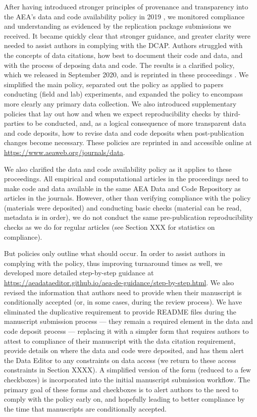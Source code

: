 \documentclass[PP]{AEA}
\begin{document}
After having introduced stronger principles of provenance and transparency into the  \ac{AEA}'s data and code availability policy in 2019 \citep{10.1257/pandp.110.dcap}, we monitored compliance and understanding as evidenced by the replication package submissions we received. It became quickly clear that stronger guidance, and greater clarity were needed to assist authors in complying with the \ac{DCAP}. Authors struggled with the concepts of data citations, how best to document their code and data, and with the process of deposing data and code. The results is a clarified policy, which we released in September 2020, and is reprinted in these proceedings \citep{10.1257/pandp.111.dcap}. We simplified the main policy,  separated out the policy as applied to papers conducting (field and lab) experiments, and expanded the policy to encompass more clearly any primary data collection. We also introduced  supplementary policies that lay out how and when we expect reproducibility checks by third-parties to be conducted, and, as a logical consequence of more transparent data and code deposits, how to revise data and code deposits when post-publication changes become necessary. These policies are reprinted in \citet{10.1257/pandp.111.dcap} and accessible online at \url{https://www.aeaweb.org/journals/data}.

We also clarified the data and code availability policy as it applies to these proceedings. All empirical and computational articles in the proceedings need to make code and data available in the same AEA Data and Code Repository as articles in the journals. However, other than verifying compliance with the policy (materials were deposited) and conducting basic checks (material can be read, metadata is in order), we do not conduct the same pre-publication reproducibility checks as we do for regular articles (see Section XXX for statistics on compliance).

But policies only outline what should occur. In order to assist authors in complying with the policy, thus improving turnaround times as well, we developed more detailed step-by-step guidance at \url{https://aeadataeditor.github.io/aea-de-guidance/step-by-step.html}. We also revised the information that authors need to provide when their manuscript is conditionally accepted (or, in some cases, during the review process). We have eliminated the duplicative requirement to provide  README files during the manuscript submission process --- they remain a required element in the data and code deposit process --- replacing it with a simpler form that requires authors to attest to compliance of their manuscript with the data citation requirement, provide details on where the data and code were deposited, and has them alert the Data Editor to any constraints on data access (we return to these access constraints in Section XXXX). A simplified version of the form (reduced to a few checkboxes) is incorporated into the initial manuscript submission workflow. The primary goal of these forms and checkboxes is to alert authors to the need to comply with the policy early on, and hopefully leading to better compliance by the time that manuscripts are conditionally accepted. 
\end{document}
